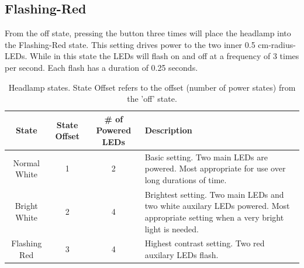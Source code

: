 \documentclass[12pt]{article}
\begin{document}
\subsection{Flashing-Red}
From the off state, pressing the button three times will place the headlamp into the Flashing-Red state.
This setting drives power to the two inner 0.5 cm-radius-LEDs. While in this state the
LEDs will flash on and off at a frequency of 3 times per second. Each flash has a duration of
0.25 seconds.

\begin{table}[h!]
\begin{center}
\begin{tabular}{ | c | c | c | p{5cm} |}
    \hline
    State & State Offset & \# of Powered LEDs & Description \\ \hline
    Normal White & 1 & 2 &  Basic setting. Two main LEDs are powered. Most appropriate for use over
    long durations of time.\\ \hline
    Bright White & 2 & 4 &  Brightest setting. Two main LEDs and two white auxilary LEDs powered.
    Most appropriate setting when a very bright light is needed.\\ \hline
    Flashing Red & 3 & 4 &  Highest contrast setting. Two red auxilary LEDs flash.\\ \hline
\end{tabular}
\end{center}
\caption[Lamp Power States] {Headlamp states. State Offset refers to the offset (number of power
states) from the 'off' state.}
\end{table}
\end{document}
